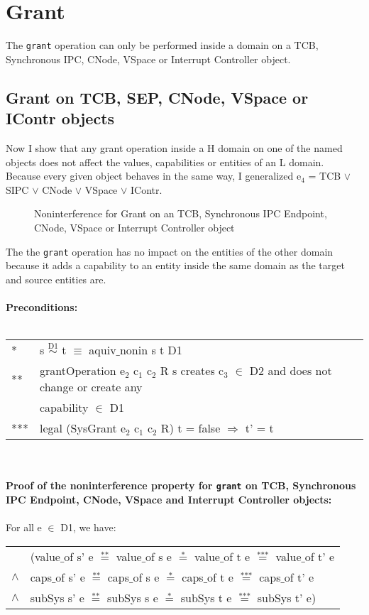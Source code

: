 \section{Grant}\label{sec:Grant}
The \texttt{grant} operation can only be performed inside a domain on a TCB, Synchronous IPC, CNode, VSpace or Interrupt Controller object. 
\subsection{Grant on TCB, SEP, CNode, VSpace or IContr objects} 
Now I show that any grant operation inside a H domain on one of the named objects does not affect the values, capabilities or entities of an L domain. \\
Because every given object behaves in the same way, I generalized e$_4$ = TCB $\vee$ SIPC $\vee$ CNode $\vee$ VSpace $\vee$ IContr.
\begin{figure}[H]
\caption{Noninterference for Grant on an TCB, Synchronous IPC Endpoint, CNode, VSpace or Interrupt Controller object}
\end{figure}
The the \texttt{grant} operation has no impact on the entities of the other domain because it adds a capability to an entity inside the same domain as the target and source entities are. \\ \\
\textbf{Preconditions:} \\ \\
\begin{tabular}{ll}
* & s $\overset{\text{D1}}{\sim}$ t $\equiv$ aquiv$\_$nonin s t D1	\\ 
** & grantOperation e$_2$ c$_1$ c$_2$ R s creates c$_3$ $\in$ D2 and does not change or create any \\
& capability $\in$ D1 \\ 
*** & legal (SysGrant e$_2$ c$_1$ c$_2$ R) t = false $\Rightarrow$ t' = t
\end{tabular}\\ \\ 
\textbf{Proof of the noninterference property for \texttt{grant} on TCB, Synchronous IPC Endpoint, CNode, VSpace and Interrupt Controller objects:}\\ \\
For all e $\in$ D1, we have: \\ 
\begin{tabular}{ll}
& (value$\_$of s' e $\overset{\text{**}}{=}$ value$\_$of s e $\overset{\text{*}}{=}$ value$\_$of t e $\overset{\text{***}}{=}$ value$\_$of t' e \\
$\wedge$ & caps$\_$of s' e $\overset{\text{**}}{=}$ caps$\_$of s e $\overset{\text{*}}{=}$ caps$\_$of t e $\overset{\text{***}}{=}$ caps$\_$of t' e \\
$\wedge$ & subSys s' e $\overset{\text{**}}{=}$ subSys s e $\overset{\text{*}}{=}$ subSys t e $\overset{\text{***}}{=}$ subSys t' e)
\end{tabular} \\
